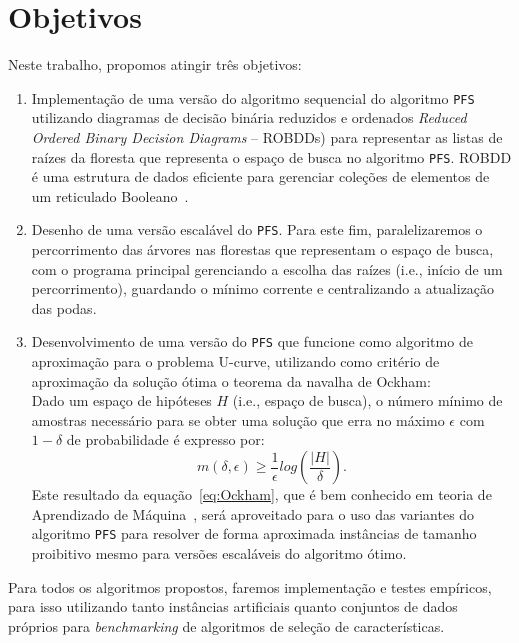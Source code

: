 \documentclass[12pt]{article}
\begin{document}
\section{Objetivos}
Neste trabalho, propomos atingir três objetivos:

\begin{enumerate}
\item Implementação de uma versão do algoritmo sequencial do algoritmo 
{\tt PFS} utilizando diagramas de decisão binária reduzidos e ordenados
{\em Reduced Ordered Binary Decision Diagrams} -- ROBDDs) para 
representar as listas de raízes da floresta que representa o espaço de
busca no algoritmo {\tt PFS}. ROBDD é uma estrutura de dados eficiente 
para gerenciar coleções de elementos de um reticulado 
Booleano~\cite{bryant}.

\item Desenho de uma versão escalável do {\tt PFS}. Para este fim, 
paralelizaremos o percorrimento das árvores nas florestas que 
representam o espaço de busca, com o programa principal gerenciando a 
escolha das raízes (i.e., início de um percorrimento), guardando o 
mínimo corrente e centralizando a atualização das podas.

\item Desenvolvimento de uma versão do {\tt PFS} que funcione como algoritmo 
de aproximação para o problema U-curve, utilizando como critério de
aproximação da solução ótima o teorema da navalha de Ockham:\\
\smallskip
Dado um espaço de hipóteses $H$ (i.e., espaço de busca), o número mínimo 
de amostras necessário para se obter uma solução que erra no máximo 
$\epsilon$ com $1 - \delta$ de probabilidade é expresso por:
\begin{equation}
\displaystyle  m(\delta,\epsilon) \ge 
    \frac{1}{\epsilon} log (\frac{|H|}{\delta}). \label{eq:Ockham}
\end{equation}
Este resultado da equação~\ref{eq:Ockham}, que é bem conhecido em teoria
de Aprendizado de Máquina~\cite{kearns}, será aproveitado para o uso das
variantes do algoritmo {\tt PFS} para resolver de forma aproximada 
instâncias de tamanho proibitivo mesmo para versões escaláveis do
algoritmo ótimo.
\end{enumerate}

Para todos os algoritmos propostos, faremos implementação e testes 
empíricos, para isso utilizando tanto instâncias artificiais quanto 
conjuntos de dados próprios para {\em benchmarking} de algoritmos de 
seleção de características.
\end{document}
